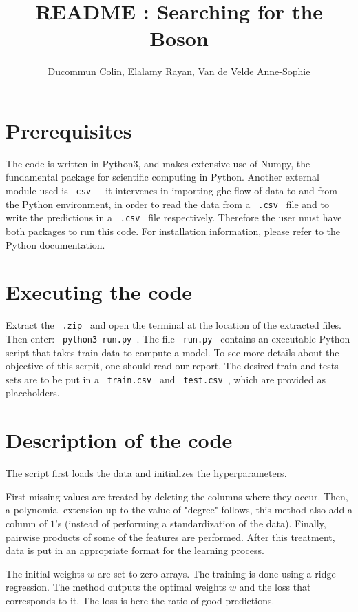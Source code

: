 \documentclass[11pt, oneside]{article}   	%
\title{README : Searching for the Boson}
\author{Ducommun Colin, Elalamy Rayan, Van de Velde Anne-Sophie}
\date{}
\begin{document}
\maketitle

\section{Prerequisites}

The code is written in Python3, and makes extensive use of Numpy, the fundamental package for scientific computing in Python. Another external module used is \lstinline" csv " - it intervenes in importing ghe flow of data to and from the Python environment, in order to read the data from a \lstinline" .csv " file and to write the predictions in a \lstinline" .csv " file respectively. Therefore the user must have both packages to run this code. For installation information, please refer to the Python documentation. 

\section{Executing the code}

Extract the \lstinline" .zip " and open the terminal at the location of the extracted files. Then enter: \lstinline" python3 run.py ". The file \lstinline" run.py " contains an executable Python script that takes train data to compute a model. To see more details about the objective of this scrpit, one should read our report. The desired train and tests sets are to be put in a \lstinline" train.csv " and \lstinline" test.csv ", which are provided as placeholders. 

\section{Description of the code}

The script first loads the data and initializes the hyperparameters. 

First missing values are treated by deleting the columns where they occur. Then, a polynomial extension up to the value of "degree" follows, this method also add a column of $1$'s (instead of performing a standardization of the data). Finally, pairwise products of some of the features are performed. After this treatment, data is put in an appropriate format for the learning process.

The initial weights $w$ are set to zero arrays. The training is done using a ridge regression. The method outputs the optimal weights $w$ and the loss that corresponds to it. The loss is here the ratio of good predictions.
\end{document}
